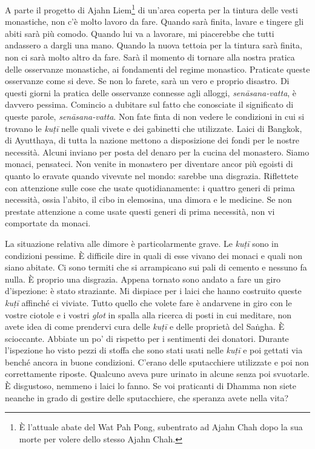 A parte il progetto di Ajahn Liem\footnote{È l'attuale abate del Wat Pah
  Pong, subentrato ad Ajahn Chah dopo la sua morte per volere dello
  stesso Ajahn Chah.} di un'area coperta per la tintura delle vesti
monastiche, non c'è molto lavoro da fare. Quando sarà finita, lavare e
tingere gli abiti sarà più comodo. Quando lui va a lavorare, mi
piacerebbe che tutti andassero a dargli una mano. Quando la nuova
tettoia per la tintura sarà finita, non ci sarà molto altro da fare.
Sarà il momento di tornare alla nostra pratica delle osservanze
monastiche, ai fondamenti del regime monastico. Praticate queste
osservanze come si deve. Se non lo farete, sarà un vero e proprio
disastro. Di questi giorni la pratica delle osservanze connesse agli
alloggi, \emph{senāsana-vatta}, è davvero pessima. Comincio a dubitare
sul fatto che conosciate il significato di queste parole,
\emph{senāsana-vatta}. Non fate finta di non vedere le condizioni in cui
si trovano le \emph{kuṭī} nelle quali vivete e dei gabinetti che
utilizzate. Laici di Bangkok, di Ayutthaya, di tutta la nazione mettono
a disposizione dei fondi per le nostre necessità. Alcuni inviano per
posta del denaro per la cucina del monastero. Siamo monaci, pensateci.
Non venite in monastero per diventare ancor più egoisti di quanto lo
eravate quando vivevate nel mondo: sarebbe una disgrazia. Riflettete con
attenzione sulle cose che usate quotidianamente: i quattro generi di
prima necessità, ossia l'abito, il cibo in elemosina, una dimora e le
medicine. Se non prestate attenzione a come usate questi generi di prima
necessità, non vi comportate da monaci.

La situazione relativa alle dimore è particolarmente grave. Le
\emph{kuṭī} sono in condizioni pessime. È difficile dire in quali di
esse vivano dei monaci e quali non siano abitate. Ci sono termiti che si
arrampicano sui pali di cemento e nessuno fa nulla. È proprio una
disgrazia. Appena tornato sono andato a fare un giro d'ispezione: è
stato straziante. Mi dispiace per i laici che hanno costruito queste
\emph{kuṭī} affinché ci viviate. Tutto quello che volete fare è
andarvene in giro con le vostre ciotole e i vostri \emph{glot} in spalla
alla ricerca di posti in cui meditare, non avete idea di come prendervi
cura delle \emph{kuṭī} e delle proprietà del Saṅgha. È scioccante.
Abbiate un po' di rispetto per i sentimenti dei donatori. Durante
l'ispezione ho visto pezzi di stoffa che sono stati usati nelle
\emph{kuṭī} e poi gettati via benché ancora in buone condizioni. C'erano
delle sputacchiere utilizzate e poi non correttamente riposte. Qualcuno
aveva pure urinato in alcune senza poi svuotarle. È disgustoso, nemmeno
i laici lo fanno. Se voi praticanti di Dhamma non siete neanche in grado
di gestire delle sputacchiere, che speranza avete nella vita?


